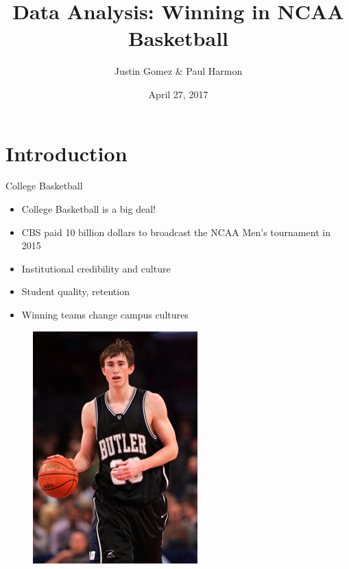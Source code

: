 \documentclass{beamer}
\title[NCAA Basketball]{Data Analysis: Winning in NCAA Basketball}
\author{Justin Gomez \& Paul Harmon}
\date{April 27, 2017}
\begin{document}
	
	\begin{frame}
		\titlepage
	\end{frame}
	

	\section{Introduction}
	
	\begin{frame}{College Basketball}
	\begin{multicols}{2}
		\begin{itemize}
		\item College Basketball is a big deal! 
		\item CBS paid 10 billion dollars to broadcast the NCAA Men's tournament in 2015 
		\item Institutional credibility and culture 
		\item Student quality, retention
		\item Winning teams change campus cultures
				
		
	\end{itemize}
	\begin{figure}[r]
		\includegraphics[height = .8\textheight]{hayward.jpg}
	\end{figure}
\end{multicols}
	
	\end{frame}
\end{document}
